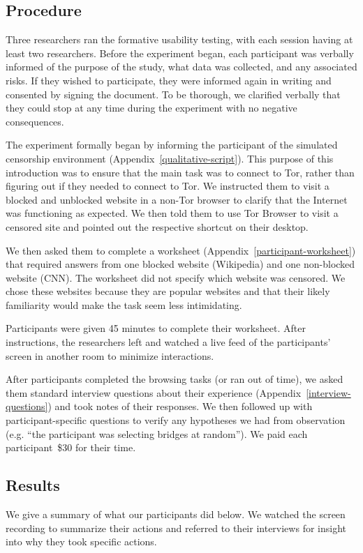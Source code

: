 \documentclass[USenglish,oneside,twocolumn]{article}
\begin{document}
\subsection{Procedure}
Three researchers ran the formative usability testing, with each session having at least two researchers.  
Before the experiment began, each participant was verbally informed of the purpose of the 
study, what data was collected, and any associated risks. If they wished to participate,
they were informed again in writing and consented by signing the document. To be thorough, 
we clarified verbally that they could stop at any time during the experiment with no negative consequences. 

The experiment formally began by informing the participant of the simulated censorship environment (Appendix~\ref{qualitative-script}). This purpose of this introduction was to ensure that the main task
was to connect to Tor, rather than figuring out if they needed to connect to Tor. 
We instructed them to visit a blocked and unblocked website
in a non-Tor browser to clarify that the Internet was functioning as expected. 
We then told them to use Tor Browser to visit a censored site and pointed out 
the respective shortcut on their desktop.

We then asked them to complete a worksheet (Appendix~\ref{participant-worksheet}) that 
required answers from one blocked website (Wikipedia) and one non-blocked website (CNN).
The worksheet did not specify which website was censored. 
We chose these websites because they are popular websites and that their likely familiarity 
would make the task seem less intimidating. 

Participants were given 45 minutes to complete their worksheet. 
After instructions, the researchers left and watched a live feed of the participants' screen in another room to minimize interactions.

After participants completed the browsing tasks (or ran out of time),
we asked them standard interview questions about their experience (Appendix~\ref{interview-questions}) and took notes of their responses. We then followed up with participant-specific questions to verify any hypotheses   we had from observation (e.g. ``the participant was selecting bridges at random''). We paid each participant~\$30 for their time. 

\subsection{Results} 
We give a summary of what our participants did below. We watched the screen recording to summarize their actions and referred to their interviews for insight into why they took specific actions. 
\end{document}
